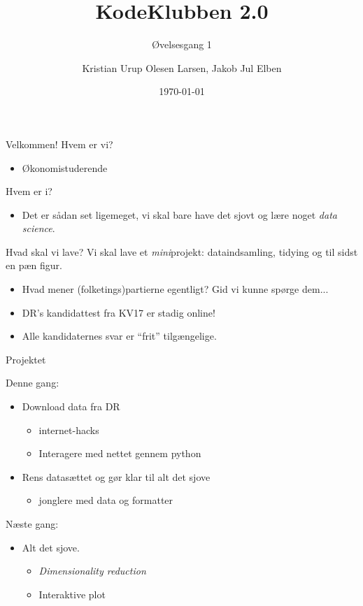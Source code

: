 \documentclass[10pt]{beamer}
\title{KodeKlubben 2.0}
\subtitle{Øvelsesgang 1}
\date{\today}
\author{Kristian Urup Olesen Larsen, Jakob Jul Elben}
\institute{Økonomisk Institut, KU}
\begin{document}
\maketitle

\begin{frame}[fragile]{Velkommen!}
Hvem er vi?
\begin{itemize}
  \item Økonomistuderende
\end{itemize}
Hvem er i?
\begin{itemize}
  \item Det er sådan set ligemeget, vi skal bare have det sjovt og lære noget \textit{data science}.
\end{itemize}
\end{frame}

\begin{frame}[fragile]{Hvad skal vi lave?}
Vi skal lave et \textit{mini}projekt: dataindsamling, tidying og til sidst en pæn figur.
\begin{itemize}
  \item<1-> Hvad mener (folketings)partierne egentligt? Gid vi kunne spørge dem...
  \item<2-> DR's kandidattest fra KV17 er stadig online!
  \item<3-> Alle kandidaternes svar er ``frit'' tilgængelige.
\end{itemize}
\end{frame}

\begin{frame}[fragile]{Projektet}

Denne gang:
\begin{itemize}
  \item Download data fra DR
  \begin{itemize}
    \item internet-hacks
    \item Interagere med nettet gennem python
  \end{itemize}
  \item Rens datasættet og gør klar til alt det sjove
  \begin{itemize}
    \item jonglere med data og formatter
  \end{itemize}
\end{itemize}

Næste gang:
\begin{itemize}
  \item Alt det sjove.
  \begin{itemize}
    \item \textit{Dimensionality reduction}
    \item Interaktive plot
  \end{itemize}
\end{itemize}
\end{frame}
\end{document}
